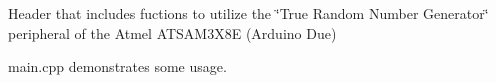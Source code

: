 Header that includes fuctions to utilize the \char`\"{}\+True Random Number Generator\char`\"{} peripheral of the Atmel A\+T\+S\+A\+M3\+X8E (Arduino Due)

main.\+cpp demonstrates some usage. 